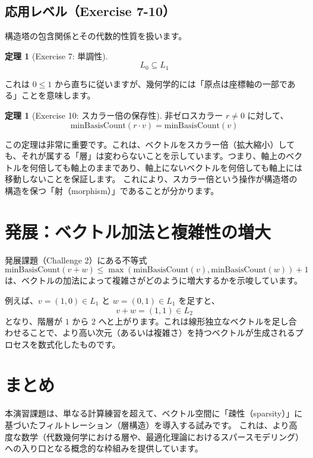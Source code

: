 \documentclass[judge=standard,11pt]{jlreq}
\theoremstyle{definition}
\newtheorem{theorem}[definition]{定理}
\newcommand{\minBasisCount}{\text{minBasisCount}}
\begin{document}
\subsection{応用レベル（Exercise 7-10）}
構造塔の包含関係とその代数的性質を扱います。

\begin{theorem}[Exercise 7: 単調性]
\[ L_0 \subseteq L_1 \]
\end{theorem}
これは $0 \le 1$ から直ちに従いますが、幾何学的には「原点は座標軸の一部である」ことを意味します。

\begin{theorem}[Exercise 10: スカラー倍の保存性]
非ゼロスカラー $r \neq 0$ に対して、
\[ \minBasisCount(r \cdot v) = \minBasisCount(v) \]
\end{theorem}
この定理は非常に重要です。これは、ベクトルをスカラー倍（拡大縮小）しても、それが属する「層」は変わらないことを示しています。つまり、軸上のベクトルを何倍しても軸上のままであり、軸上にないベクトルを何倍しても軸上には移動しないことを保証します。
これにより、スカラー倍という操作が構造塔の構造を保つ「射（morphism）」であることが分かります。

\section{発展：ベクトル加法と複雑性の増大}

発展課題（Challenge 2）にある不等式
\[ \minBasisCount(v + w) \le \max(\minBasisCount(v), \minBasisCount(w)) + 1 \]
は、ベクトルの加法によって複雑さがどのように増大するかを示唆しています。

例えば、$v=(1,0) \in L_1$ と $w=(0,1) \in L_1$ を足すと、
\[ v + w = (1,1) \in L_2 \]
となり、階層が $1$ から $2$ へと上がります。これは線形独立なベクトルを足し合わせることで、より高い次元（あるいは複雑さ）を持つベクトルが生成されるプロセスを数式化したものです。

\section{まとめ}
本演習課題は、単なる計算練習を超えて、ベクトル空間に「疎性（sparsity）」に基づいたフィルトレーション（層構造）を導入する試みです。
これは、より高度な数学（代数幾何学における層や、最適化理論におけるスパースモデリング）への入り口となる概念的な枠組みを提供しています。
\end{document}
